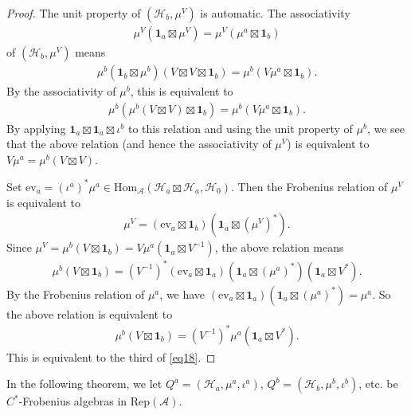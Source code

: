 \documentclass[12pt,a4paper,notitlepage]{article}
\theoremstyle{definition}
\theoremstyle{plain}
\newcommand{\mc}{\mathcal}
\newcommand{\id}{\mathbf{1}}
\newcommand{\Hom}{\mathrm{Hom}}
\newcommand{\ev}{\mathrm{ev}}
\newcommand{\RepA}{\mathrm{Rep}(\mathcal A)}
\numberwithin{equation}{section}
\begin{document}
\begin{proof}
The unit property of $(\mc H_b,\mu^V)$ is automatic. The associativity 
\begin{align*}
\mu^V(\id_a\boxtimes\mu^V)=\mu^V(\mu^a\boxtimes\id_b)	
\end{align*}
of $(\mc H_b,\mu^V)$ means
\begin{align*}
\mu^b(\id_b\boxtimes\mu^b)(V\boxtimes V\boxtimes\id_b)=	\mu^b(V\mu^a\boxtimes\id_b).
\end{align*}
By the associativity of $\mu^b$, this is equivalent to
\begin{align*}
	\mu^b(\mu^b(V\boxtimes V)\boxtimes\id_b)=	\mu^b(V\mu^a\boxtimes\id_b).
\end{align*}
By applying $\id_a\boxtimes\id_a\boxtimes\iota^b$ to this relation and using the unit property of $\mu^b$, we see that the above relation (and hence the associativity of $\mu^V$) is equivalent to $V\mu^a=\mu^b(V\boxtimes V)$.

Set $\ev_a=(\iota^a)^*\mu^a\in\Hom_{\mc A}(\mc H_a\boxtimes\mc H_a,\mc H_0)$. Then the Frobenius relation of $\mu^V$ is equivalent to
\begin{align*}
\mu^V=(\ev_a\boxtimes\id_b)(\id_a\boxtimes(\mu^V)^*).
\end{align*}
Since $\mu^V=\mu^b(V\boxtimes\id_b)=V\mu^a(\id_a\boxtimes V^{-1})$, the above relation means
\begin{align*}
\mu^b(V\boxtimes\id_b)=(V^{-1})^*(\ev_a\boxtimes\id_a)(\id_a\boxtimes(\mu^a)^*)(\id_a\boxtimes V^*).
\end{align*}
By the Frobenius relation of $\mu^a$, we have $(\ev_a\boxtimes\id_a)(\id_a\boxtimes(\mu^a)^*)=\mu^a$. So the above relation is equivalent to
\begin{align*}
\mu^b(V\boxtimes\id_b)=(V^{-1})^*\mu^a(\id_a\boxtimes V^*).
\end{align*}
This is equivalent to the third of \eqref{eq18}.
\end{proof}


In the following theorem, we let $Q^a=(\mc H_a,\mu^a,\iota^a)$, $Q^b=(\mc H_b,\mu^b,\iota^b)$, etc. be $C^*$-Frobenius algebras in $\RepA$.
\end{document}
